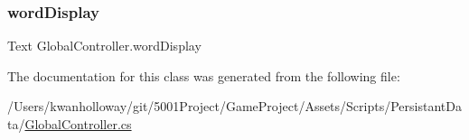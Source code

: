 \mbox{\label{class_global_controller_a8140e86b843db24566ec5fbf223eeafa}} 
\subsubsection{\texorpdfstring{word\+Display}{wordDisplay}}
{\footnotesize\ttfamily Text Global\+Controller.\+word\+Display}



The documentation for this class was generated from the following file\+:\begin{DoxyCompactItemize}
\item 
/\+Users/kwanholloway/git/5001\+Project/\+Game\+Project/\+Assets/\+Scripts/\+Persistant\+Data/\hyperlink{_global_controller_8cs}{Global\+Controller.\+cs}\end{DoxyCompactItemize}
